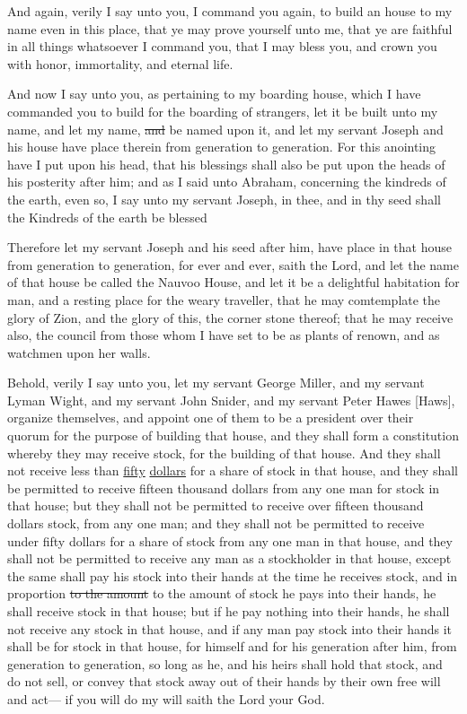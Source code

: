 				And again, verily I say unto you, I command you again, to build an house to my name even in this place, that ye may prove yourself unto me, that ye are faithful in all things whatsoever I command you, that I may bless you, and crown you with honor, immortality, and eternal life.

				And now I say unto you, as pertaining to my boarding house, which I have commanded you to build for the boarding of strangers, let it be built unto my name, and let my name, \sout{and} be named upon it, and let my servant Joseph and his house have place therein from generation to generation. For this anointing have I put upon his head, that his blessings shall also be put upon the heads of his posterity after him; and as I said unto Abraham, concerning the kindreds of the earth, even so, I say unto my servant Joseph, in thee, and in thy seed shall the Kindreds of the earth be blessed

				Therefore let my servant Joseph and his seed after him, have place in that house from generation to generation, for ever and ever, saith the Lord, and let the name of that house be called the Nauvoo House, and let it be a delightful habitation for man, and a resting place for the weary traveller, that he may comtemplate the glory of Zion, and the glory of this, the corner stone thereof; that he may receive also, the council from those whom I have set to be as plants of renown, and as watchmen upon her walls.

				Behold, verily I say unto you, let my servant George Miller, and my servant Lyman Wight, and my servant John Snider, and my servant Peter Hawes [Haws], organize themselves, and appoint one of them to be a president over their quorum for the purpose of building that house, and they shall form a constitution whereby they may receive stock, for the building of that house. And they shall not receive less than \uline{fifty} \uline{dollars} for a share of stock in that house, and they shall be permitted to receive fifteen thousand dollars from any one man for stock in that house; but they shall not be permitted to receive over fifteen thousand dollars stock, from any one man; and they shall not be permitted to receive under fifty dollars for a share of stock from any one man in that house, and they shall not be permitted to receive any man as a stockholder in that house, except the same shall pay his stock into their hands at the time he receives stock, and in proportion \sout{to the amount} to the amount of stock he pays into their hands, he shall receive stock in that house; but if he pay nothing into their hands, he shall not receive any stock in that house, and if any man pay stock into their hands it shall be for stock in that house, for himself and for his generation after him, from generation to generation, so long as he, and his heirs shall hold that stock, and do not sell, or convey that stock away out of their hands by their own free will and act--- if you will do my will saith the Lord your God.

